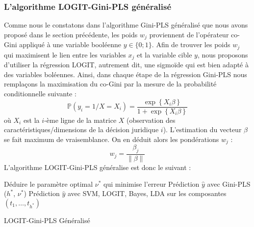 \subsubsection{L'algorithme LOGIT-Gini-PLS généralisé} 
\label{sec:sensresultat:logit-gini-pls}
Comme nous le constatons dans l'algorithme Gini-PLS généralisé que nous avons proposé dans le section précédente, les poids $w_j$ proviennent de l'opérateur co-Gini appliqué à une variable booléenne $y \in \lbrace 0;1 \rbrace$. Afin de trouver les poids $w_j$ qui maximisent le lien entre les variables $x_j$ et la variable cible $y$, nous proposons d'utiliser la régression LOGIT, autrement dit, une sigmoïde qui est bien adapté à des variables boléennes. Ainsi, dans chaque étape de la régression Gini-PLS nous remplaçons la maximisation du co-Gini par la mesure de la probabilité conditionnelle suivante :
\begin{equation}\tag{LOGIT}
\mathbb{P}(y_i = 1 / X = X_i) = \frac{\exp\left\{X_i \beta \right\}}{1+\exp\left\{ X_i \beta \right\}}
\end{equation}
où $X_i$ est la $i$-ème ligne de la matrice $X$ (observation des caractéristiques/dimensions de la décision juridique $i$). L'estimation du vecteur $\beta$ se fait maximum de vraisemblance. On en déduit alors les pondérations $w_j$ :
\[
w_j = \frac{\beta_j}{\| \beta\|}
\]
L'algorithme LOGIT-Gini-PLS généralise est donc le suivant :

\begin{algorithm}[H]
	\scriptsize
	Déduire le paramètre optimal $\nu^*$ qui minimise l'erreur \; 
	\Return Prédiction $\hat{y}$ avec Gini-PLS ($h^*$, $\nu^*$) \;
	\Return Prédiction $\hat{y}$ avec SVM, LOGIT, Bayes, LDA sur les composantes $(t_1,\ldots,t_{h^*})$\;
	\caption{LOGIT-Gini-PLS Généralisé}\label{G-GPLS}
\end{algorithm}


